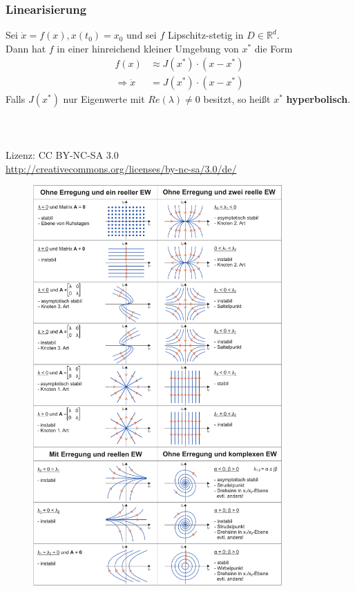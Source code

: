 \documentclass[a4paper,twocolumn,10pt]{article}
\begin{document}
\subsubsection{Linearisierung}
Sei $\dot{x}=f(x),x(t_0)=x_0$ und sei $f$ Lipschitz-stetig in $D\in\mathbb{R}^d$.\\
Dann hat $f$ in einer hinreichend kleiner Umgebung von $x^*$ die Form
\begin{equation*}
\begin{split}
f(x)&\approx J(x^*)\cdot (x-x^*)\\
\Rightarrow \dot{x}&=J(x^*)\cdot (x-x^*)
\end{split}
\end{equation*}
Falls $J(x^*)$ nur Eigenwerte mit $Re(\lambda)\neq 0$ besitzt, so heißt $x^*$ \textbf{hyperbolisch}.
\\\\\\\\
Lizenz: CC BY-NC-SA 3.0\\
\url{http://creativecommons.org/licenses/by-nc-sa/3.0/de/}
\newpage
\begin{figure}
\begin{center}
\includegraphics[width=0.85\textwidth]{Grafiken/Phasenportraits}
\end{center}
\end{figure}
\end{document}
